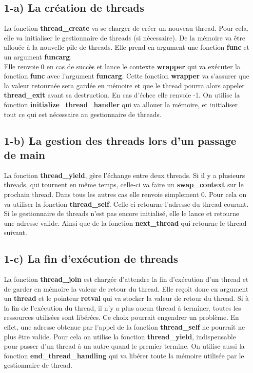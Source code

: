 \documentclass{report}
\begin{document}
\subsection*{1-a) La création de threads}
La fonction \textbf{thread\_create} va se charger de créer un nouveau thread. Pour cela, elle va initialiser le gestionnaire de threads (si nécessaire). De la mémoire va être allouée à la nouvelle pile de threads. Elle prend en argument une fonction \textbf{func} et un argument \textbf{funcarg}.
\\
Elle renvoie 0 en cas de succès et lance le contexte \textbf{wrapper} qui va exécuter la fonction \textbf{func} avec l'argument \textbf{funcarg}.
Cette fonction \textbf{wrapper} va s'assurer que la valeur retournée sera gardée en mémoire et que le thread pourra alors appeler \textbf{thread\_exit} avant sa destruction.
En cas d'échec elle renvoie -1.
On utilise la fonction \textbf{initialize\_thread\_handler} qui va allouer la mémoire, et initialiser tout ce qui est nécessaire au gestionnaire de threads.

\subsection*{1-b) La gestion des threads lors d'un passage de main}
La fonction \textbf{thread\_yield}, gère l'échange entre deux threads.
Si il y a plusieurs threads, qui tournent en même temps, celle-ci va faire un \textbf{swap\_context} sur le prochain thread.
Dans tous les autres cas elle renvoie simplement 0.
Pour cela on va utiliser la fonction \textbf{thread\_self}.
Celle-ci retourne l'adresse du thread courant. Si le gestionnaire de threads n'est pas encore initialisé, elle le lance et retourne une adresse valide.
Ainsi que de la fonction \textbf{next\_thread} qui retourne le thread suivant.

\subsection*{1-c) La fin d'exécution de threads}
La fonction \textbf{thread\_join} est chargée d'attendre la fin d'exécution d'un thread et de garder en mémoire la valeur de retour du thread.
Elle reçoit donc en argument un \textbf{thread} et le pointeur \textbf{retval} qui va stocker la valeur de retour du thread.
Si à la fin de l'exécution du thread, il n'y a plus aucun thread à terminer, toutes les ressources utilisées sont libérées. Ce choix pourrait engendrer un problème. En effet, une adresse obtenue par l'appel de la fonction \textbf{thread\_self} ne pourrait ne plus être valide.
Pour cela on utilise la fonction \textbf{thread\_yield}, indispensable pour passer d'un thread à un autre quand le premier termine.
On utilise aussi la fonction \textbf{end\_thread\_handling} qui va libérer toute la mémoire utilisée par le gestionnaire de thread.
\end{document}
